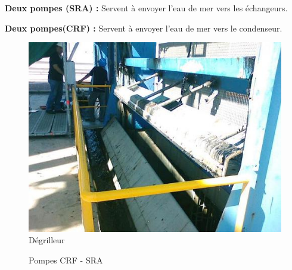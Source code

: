 \textbf{Deux  pompes (SRA) : }Servent à envoyer l'eau de mer vers les échangeurs.

\textbf{Deux pompes(CRF) : }Servent à envoyer l'eau de mer vers le condenseur.
\begin{figure}[hbtp]
\centering
\includegraphics[scale=0.7]{./Figures/degrilleur.png}
\caption{Dégrilleur}
\end{figure}
\begin{figure}[ht]
\centering
{}
\caption{Pompes CRF - SRA}
\label{fig:pompes}
\end{figure}
